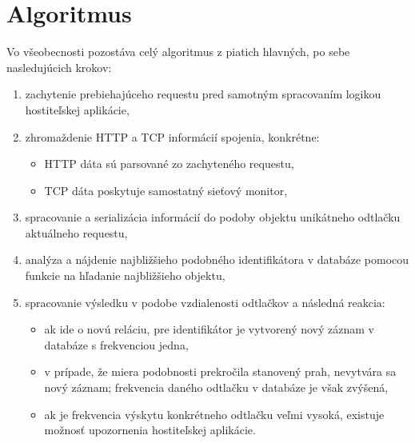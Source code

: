 \documentclass[
  printed, %
  table,   %
  lof,     %
  nolot,   %
  nocover
]{fithesis3}
\begin{document}
\section{Algoritmus}
Vo všeobecnosti pozostáva celý algoritmus z piatich hlavných, po sebe nasledujúcich krokov:
\begin{enumerate}
  \item zachytenie prebiehajúceho requestu pred samotným spracovaním logikou hostiteľskej aplikácie,
  \item zhromaždenie HTTP a TCP informácií spojenia, konkrétne:
  \begin{itemize}
    \item HTTP dáta sú parsované zo zachyteného requestu,
    \item TCP dáta poskytuje samostatný sieťový monitor,
  \end{itemize}
  \item spracovanie a serializácia informácií do podoby objektu unikátneho odtlačku
  aktuálneho requestu,
  \item analýza a nájdenie najbližšieho podobného identifikátora v databáze pomocou funkcie na
  hľadanie najbližšieho objektu,
  \item spracovanie výsledku v podobe vzdialenosti odtlačkov a následná reakcia:
  \begin{itemize}
    \item ak ide o novú reláciu, pre identifikátor je vytvorený nový záznam v databáze s frekvenciou jedna,
    \item v prípade, že miera podobnosti prekročila stanovený prah, nevytvára
    sa nový záznam; frekvencia daného odtlačku v databáze je však zvýšená,
    \item ak je frekvencia výskytu konkrétneho odtlačku veľmi vysoká, existuje
    možnosť upozornenia hostiteľskej aplikácie.
  \end{itemize}
\end{enumerate}
\end{document}
